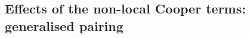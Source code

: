 %

\subsection{Effects of the non-local Cooper terms: generalised pairing}\label{subsec:sc-cooper}

